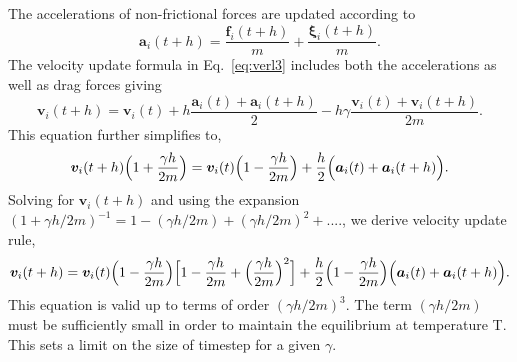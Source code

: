 \documentclass[../talant.diss.submit.tex]{subfiles}
\begin{document}
The accelerations of non-frictional forces are updated according to
%
\begin{equation}
  \label{eq:force_update}
  \bm{a}_{i}(t+h) = \frac{\bm{f}_{i}(t+h)}{m} + \frac{\bm{\xi}_{i}(t+h)}{m}.
\end{equation}
%
The velocity update formula in Eq.~\ref{eq:verl3} includes both the accelerations as well as
drag forces giving
%
%
\begin{equation}
  \label{eq:vel_update_ver}
  \bm{v}_{i}(t+h) = \bm{v}_{i}(t) + h \frac{\bm{a}_{i}(t) + \bm{a}_{i}(t+h)}{2} -
  h \gamma \frac{\bm{v}_i(t) + \bm{v}_i(t+h)}{2m}.   
\end{equation}
%
This equation further simplifies to,
%
\begin{equation}
  \label{eq:vel_update1}
  \bm{v}_{i}(t+h)\Big(1 + \frac{\gamma h}{2m}\Big) = \bm{v}_{i}(t)\Big(1 - \frac{\gamma h}{2m}\Big) + \\
  \frac{h}{2} \Big (\bm{a}_{i}(t) + \bm{a}_{i}(t+h)\Big ). 
\end{equation}
%
%
Solving for $\bm{v}_i(t+h)$ and using the expansion
$(1 + \gamma h/2m)^{-1} = 1 - (\gamma h/2m) + (\gamma h/2m)^2 + ....$,
we derive velocity update rule,
%
\begin{equation}
  \label{eq:vel_update}
  \bm{v}_{i}(t+h) = \bm{v}_{i}(t)\Big(1 - \frac{\gamma h}{2m}\Big) \\
  \Big[1 - \frac{\gamma h}{2m} + \Big( \frac{\gamma h}{2m} \Big)^2 \Big] + \\
  \frac{h}{2} \Big(1 - \frac{\gamma h}{2m} \Big) \Big (\bm{a}_{i}(t) + \bm{a}_{i}(t+h)\Big).   
\end{equation}
%
This equation is valid up to terms of order $(\gamma h/2m)^3$. The term  $(\gamma h/2m)$ must be sufficiently small
in order to maintain the equilibrium at temperature T. This sets a limit on the size of timestep for
a given $\gamma$.
\end{document}
